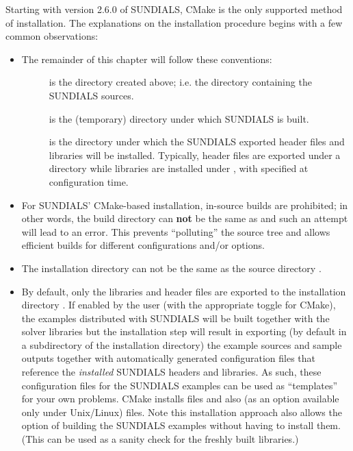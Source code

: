 \documentclass[letterpaper,10pt,english]{sphinxmanual}
\begin{document}
Starting with version 2.6.0 of SUNDIALS, CMake is the only supported
method of installation.  The explanations on the installation
procedure begins with a few common observations:
\begin{itemize}
\item {} 
The remainder of this chapter will follow these conventions:
\begin{description}
\item[{}] \leavevmode
is the directory  created above; i.e. the
directory containing the SUNDIALS sources.

\item[{}] \leavevmode
is the (temporary) directory under which SUNDIALS is built.

\item[{}] \leavevmode
is the directory under which the SUNDIALS exported header files
and libraries will be installed. Typically, header files are
exported under a directory  while libraries
are installed under , with 
specified at configuration time.

\end{description}

\item {} 
For SUNDIALS' CMake-based installation, in-source builds are prohibited;
in other words, the build directory  can \textbf{not} be the
same as  and such an attempt will lead to an error.  This
prevents ``polluting'' the source tree and allows efficient builds for
different configurations and/or options.

\item {} 
The installation directory  can not be the same as
the source directory .

\item {} 
By default, only the libraries and header files are exported to the
installation directory .  If enabled by the user (with the
appropriate toggle for CMake), the
examples distributed with SUNDIALS will be built together with
the solver libraries but the installation step will result in
exporting (by default in a subdirectory of the installation
directory) the example sources and sample outputs together with
automatically generated configuration files that reference the
\emph{installed} SUNDIALS headers and libraries.  As such, these
configuration files for the SUNDIALS examples can be used as
``templates'' for your own problems. CMake installs
 files and also (as an option available only under
Unix/Linux)  files. Note this installation approach also
allows the option of building the SUNDIALS examples without having
to install them.  (This can be used as a sanity check for the
freshly built libraries.)


\end{itemize}
\end{document}
